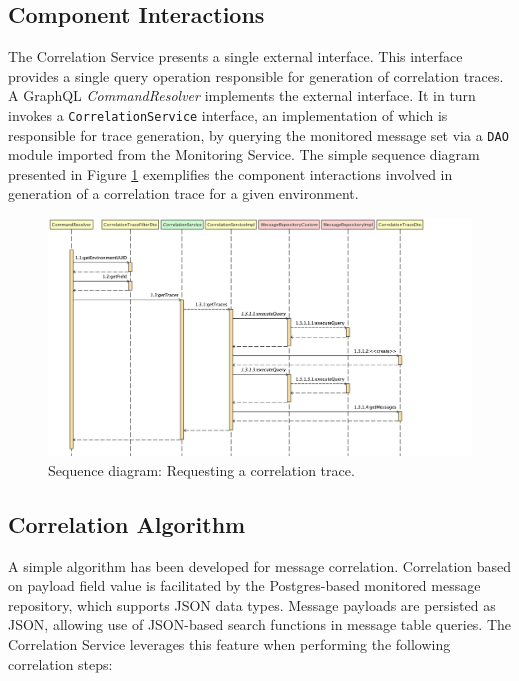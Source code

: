 \subsection{Component Interactions}
The Correlation Service presents a single external interface. This interface provides a single query operation responsible for generation of correlation traces. A GraphQL \textit {CommandResolver} implements the external interface. It in turn invokes a \texttt{CorrelationService} interface, an implementation of which is responsible for trace generation, by querying the monitored message set via a  \texttt{DAO} module imported from the Monitoring Service. The simple sequence diagram presented in Figure  \ref{correlation_svc_seq_diagram} exemplifies the component interactions involved in generation of a correlation trace for a given environment.

\begin{figure}[H]
	\centering  
	\includegraphics[width=\linewidth]{figures/impl/correlation/sequence.png}
	\caption{Sequence diagram: Requesting a correlation trace.}
	\label{correlation_svc_seq_diagram}
\end{figure}

\subsection{Correlation Algorithm}
A simple algorithm has been developed for message correlation. Correlation based on payload field value is facilitated by the Postgres-based monitored message repository, which supports JSON data types. Message payloads are persisted as JSON, allowing use of JSON-based search functions in message table queries. The Correlation Service leverages this feature when performing the following correlation steps:

